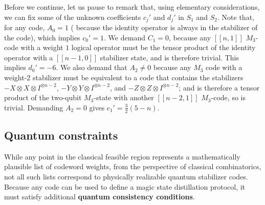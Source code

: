 \documentclass[11pt]{article}
\begin{document}
Before we continue, let us pause to remark that, using elementary considerations, we can fix some of the unknown coefficients $c_j'$ and $d_j'$ in $S_1$ and $S_2$. Note that, for any code, $A_0=1$ ({ because the identity operator is always in the stabilizer of the code}), which implies $c_0'=1$. We demand $C_1=0$, because any $[[n,1]]$ $M_3$-code with a weight $1$ logical operator must be the tensor product of the identity operator with a $[[n-1,0]]$ stabilizer state, and is therefore trivial. This implies $d_0'=-6$. We also demand that $A_2 \neq 0$ because any $M_3$ code with a weight-2 stabilizer must be equivalent to a code that contains the stabilizers $-X\otimes X \otimes I^{\otimes n-2}$, { $-Y\otimes Y \otimes I^{\otimes n-2}$}, and $-Z\otimes Z \otimes I^{\otimes n-2}$; and is therefore a tensor product of the two-qubit $M_3$-state with another $[[n-2,1]]$ $M_3$-code, so is trivial. Demanding $A_2=0$ gives $c_1'=\frac{3}{2}(5-n)$.

\subsection{Quantum constraints}
\label{sec:quantum-consistency}

While any point in the classical feasible region represents a mathematically plausible list of codeword weights, from the perspective of classical combinatorics, not all such lists correspond to physically realizable quantum stabilizer codes.
Because any code can be used to define a magic state distillation protocol, it must satisfy additional \textbf{quantum consistency conditions}.
\end{document}
